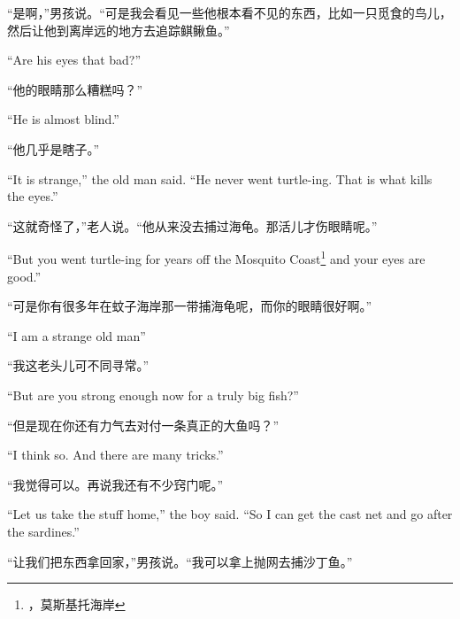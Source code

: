 \begin{paracol}{2}
\switchcolumn

“是啊，”男孩说。“可是我会看见一些他根本看不见的东西，比如一只觅食的鸟儿，然后让他到离岸远的地方去追踪鲯鳅鱼。”

\switchcolumn*

``Are his eyes that bad?''

\switchcolumn

“他的眼睛那么糟糕吗？”

\switchcolumn*

``He is almost blind.''

\switchcolumn

“他几乎是瞎子。”

\switchcolumn*

``It is strange,'' the old man said. ``He never went \gls{turtle}-ing. That is what kills the eyes.''

\switchcolumn

“这就奇怪了，”老人说。“他从来没去捕过海龟。那活儿才伤眼睛呢。”

\switchcolumn*

``But you went turtle-ing for years off the Mosquito
Coast\footnote{，莫斯基托海岸} and your eyes
are good.''

\switchcolumn

“可是你有很多年在蚊子海岸那一带捕海龟呢，而你的眼睛很好啊。”

\switchcolumn*

``I am a \gls{strange} old man''

\switchcolumn

“我这老头儿可不同寻常。”

\switchcolumn*

``But are you strong enough now for a truly big fish?''

\switchcolumn

“但是现在你还有力气去对付一条真正的大鱼吗？”

\switchcolumn*

``I think so. And there are many \glspl{trick}.''

\switchcolumn

“我觉得可以。再说我还有不少窍门呢。”

\switchcolumn*

``Let us take the \gls{stuff} home,'' the boy said. ``So I can get the \gls{cast} net and go after the sardines.''

\switchcolumn

“让我们把东西拿回家，”男孩说。“我可以拿上抛网去捕沙丁鱼。”


\end{paracol}
